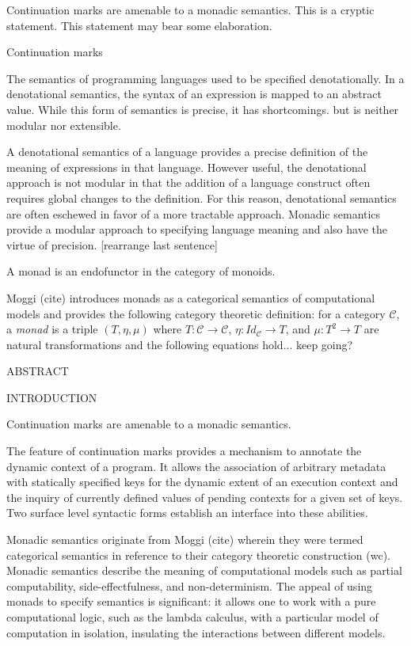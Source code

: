 \documentclass[ms]{byuprop}
\title{\Title}
\author{\Author}
\begin{document}
\maketitle


Continuation marks are amenable to a monadic semantics. This is a cryptic statement. This statement may bear some elaboration. 

Continuation marks

The semantics of programming languages used to be specified denotationally. In a denotational semantics, the syntax of an expression is mapped to an abstract value. While this form of semantics is precise, it has shortcomings.  but is neither modular nor extensible.

A denotational semantics of a language provides a precise definition of the meaning of expressions in that language. However useful, the denotational approach is not modular in that the addition of a language construct often requires global changes to the definition. For this reason, denotational semantics are often eschewed in favor of a more tractable approach. Monadic semantics provide a modular approach to specifying language meaning and also have the virtue of precision. [rearrange last sentence]

A monad is an endofunctor in the category of monoids.

Moggi (cite) introduces monads as a categorical semantics of computational models and provides the following category theoretic definition: for a category $\mathcal{C}$, a \emph{monad} is a triple $(T,\eta,\mu)$ where $T:\mathcal{C}\rightarrow\mathcal{C}$, $\eta:Id_{\mathcal{C}}\rightarrow T$, and $\mu:T^{2}\rightarrow T$ are natural transformations and the following equations hold... keep going?

ABSTRACT

INTRODUCTION

Continuation marks are amenable to a monadic semantics.

The feature of continuation marks provides a mechanism to annotate the dynamic  context of a program. It allows the association of arbitrary metadata with statically specified keys for the dynamic extent of an execution context and the inquiry of currently defined values of pending contexts for a given set of keys. Two surface level syntactic forms establish an interface into these abilities.

Monadic semantics originate from Moggi (cite) wherein they were termed categorical semantics in reference to their category theoretic construction (wc). Monadic semantics describe the meaning of computational models such as partial computability, side-effectfulness, and non-determinism. The appeal of using monads to specify semantics is significant: it allows one to work with a pure computational logic, such as the lambda calculus, with a particular model of computation in isolation, insulating the interactions between different models.
\end{document}
